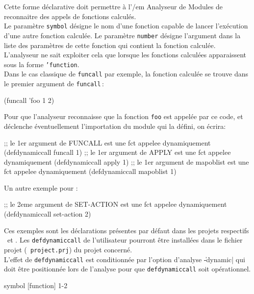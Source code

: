 Cette forme d\'{e}clarative doit permettre \`{a} l'{/em Analyseur de Modules} de
reconnaitre des appels de fonctions calcul\'{e}s. \\
Le param\`{e}tre {\tt symbol} d\'{e}signe le nom d'une fonction capable de
lancer l'ex\'{e}cution d'une autre fonction calcul\'{e}e. 
Le param\`{e}tre {\tt number} d\'{e}signe l'argument dans la
liste des param\`{e}tres de cette fonction qui contient la fonction
calcul\'{e}e. L'analyseur ne sait exploiter cela que lorsque les
fonctions calcul\'{e}es apparaissent sous la forme {\tt 'function}. \\
Dans le cas classique de {\tt funcall} par exemple, la fonction
calcul\'{e}e se trouve dans le premier argument de {\tt funcall}\,:
\begin{Code*}
(funcall 'foo 1 2) 
\end{Code*}
Pour que l'analyseur reconnaisse que la fonction {\tt foo} est
appel\'{e}e par ce code, et d\'{e}clenche \'{e}ventuellement l'importation du
module qui la d\'{e}fini, on \'{e}crira:
\begin{Code*}
;; le 1er argument de FUNCALL est une fct appelee dynamiquement
(defdynamiccall funcall 1)
;; le 1er argument de APPLY est une fct appelee dynamiquement
(defdynamiccall apply 1)
;; le 1er argument de mapoblist est une fct appelee dynamiquement
(defdynamiccall mapoblist 1)
\end{Code*}
Un autre exemple pour \Aida:
\begin{Code*}
;; le 2eme argument de SET-ACTION est une fct appelee dynamiquement
(defdynamiccall set-action 2)
\end{Code*}
Ces exemples sont les d\'{e}clarations pr\'{e}sentes par d\'{e}faut dans les
projets respectifs \LeLisp\ et \Aida. Les {\tt defdynamiccall} de
l'utilisateur pourront \^{e}tre install\'{e}es dans le fichier projet ({\tt
project.prj}) du projet concern\'{e}.\\
L'effet de {\tt defdynamiccall} est conditionn\'{e}e par l'option d'analyse
\|-dynamic| qui doit \^{e}tre positionn\'{e}e lors de l'analyse pour que
{\tt defdynamiccall} soit op\'{e}rationnel. 

 {symbol [function]} {1-2}

